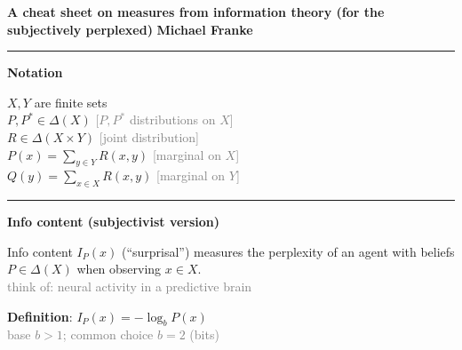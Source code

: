 \documentclass[a4paper,fleqn,reqno,12pt,landscape]{article}
\date{}
\newcommand{\mygray}[1]{\textcolor{gray}{#1}}
\newcommand{\mycomment}[1]{{\footnotesize \hfill \mygray{[#1]}}}
\newcommand{\myremark}[1]{{\footnotesize\mygray{#1}}}
\newcommand{\myrule}{\bigskip \hrule \bigskip \bigskip}
\begin{document}
\thispagestyle{empty}

\noindent \textbf{A cheat sheet on measures from information theory (for the subjectively perplexed)} \hfill \textbf{Michael Franke}

\hrule

\bigskip


\begin{paracol}{2}


  \textbf{Notation}

  \medskip

  $X,Y$ are finite sets
  \\
  $P,P^{*} \in \Delta(X)$ \hfill \mycomment{$P,P^{*}$ distributions on $X$}
  \\
  $R \in \Delta(X \times Y)$ \mycomment{joint distribution}
  \\
  $P(x) = \sum_{y \in Y} R(x,y)$ \mycomment{marginal on $X$}
  \\
  $Q(y) = \sum_{x \in X} R(x,y)$ \mycomment{marginal on $Y$}

  \myrule

  \textbf{Info content (subjectivist version)}
  \medskip

  Info content $I_{P}(x)$ (``surprisal'') measures the perplexity of an agent with beliefs $P \in \Delta(X)$ when observing $x \in X$.
  \\
  \myremark{\hfill think of: neural activity in a predictive brain}

  \medskip

  \textbf{Definition}: $I_{P}(x) = - \log_{b} P(x)$
  \\
  \myremark{\hfill base $b>1$; common choice $b=2$ (bits)}

  \bigskip

\end{paracol}
\end{document}
